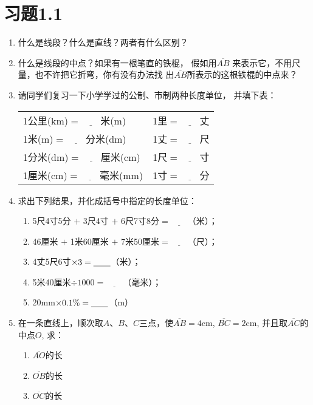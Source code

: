 \section*{习题1.1}
\begin{enumerate}
	\item 什么是线段？什么是直线？两者有什么区别？
	\item 什么是线段的中点？如果有一根笔直的铁棍，
	假如用$\overline{AB}$
	来表示它，不用尺量，也不许把它折弯，你有没有办法找
	出$\overline{AB}$所表示的这根铁棍的中点来？
	\item 请同学们复习一下小学学过的公制、市制两种长度单位，
	并填下表：
	\begin{center}
\begin{tabular}{ll}
	1公里(km)$=\underline{\qquad}$米(m) &\qquad 1里$=\underline{\qquad}$丈\\
1米(m)$=\underline{\qquad}$分米(dm)&\qquad 1丈$=\underline{\qquad}$尺\\
1分米(dm)$=\underline{\qquad}$厘米(cm)&\qquad 1尺$=\underline{\qquad}$寸\\
1厘米(cm)$=\underline{\qquad}$毫米(mm)&\qquad 1寸$=\underline{\qquad}$分
\end{tabular}		
	\end{center}

	\item 	求出下列结果，并化成括号中指定的长度单位：
\begin{enumerate}
\item 5尺4寸5分 $+$ 3尺4寸 $+$ 6尺7寸8分$=\underline{\qquad}$（米）；
\item 46厘米 $+$ 1米60厘米 $+$ 7米50厘米$=\underline{\qquad}$（尺）；
\item 4丈5尺6寸$\times3=\underline{\qquad}$（米）；
\item 5米40厘米$\div 1000=\underline{\qquad}$（毫米）；
\item 20mm$\times0.1\%=\underline{\qquad}$（m）
\end{enumerate}

\item 在一条直线上，顺次取$A$、$B$、$C$三点，使$\overline{AB}=4$cm, $\overline{BC}=2$cm, 并且取$\overline{AC}$的中点$O$, 求：
\begin{multicols}{3}
	\begin{enumerate}
		\item $\overline{AO}$的长
		\item $\overline{OB}$的长
		\item $\overline{OC}$的长
	\end{enumerate}
\end{multicols}


\end{enumerate}
